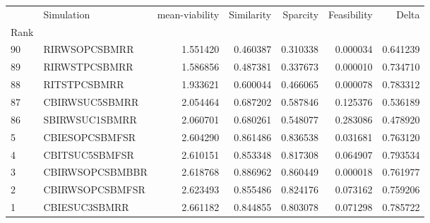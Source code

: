 \begin{tabular}{llrrrrr}
 & Simulation & mean-viability & Similarity & Sparcity & Feasibility & Delta \\
Rank &  &  &  &  &  &  \\
90 & RI\-RWS\-OPC\-SBM\-RR & 1.551420 & 0.460387 & 0.310338 & 0.000034 & 0.641239 \\
89 & RI\-RWS\-TPC\-SBM\-RR & 1.586856 & 0.487381 & 0.337673 & 0.000010 & 0.734710 \\
88 & RI\-TS\-TPC\-SBM\-RR & 1.933621 & 0.600044 & 0.466065 & 0.000078 & 0.783312 \\
87 & CBI\-RWS\-UC5\-SBM\-RR & 2.054464 & 0.687202 & 0.587846 & 0.125376 & 0.536189 \\
86 & SBI\-RWS\-UC1\-SBM\-RR & 2.060701 & 0.680261 & 0.548077 & 0.283086 & 0.478920 \\
5 & CBI\-ES\-OPC\-SBM\-FSR & 2.604290 & 0.861486 & 0.836538 & 0.031681 & 0.763120 \\
4 & CBI\-TS\-UC5\-SBM\-FSR & 2.610151 & 0.853348 & 0.817308 & 0.064907 & 0.793534 \\
3 & CBI\-RWS\-OPC\-SBM\-BBR & 2.618768 & 0.886962 & 0.860449 & 0.000018 & 0.761977 \\
2 & CBI\-RWS\-OPC\-SBM\-FSR & 2.623493 & 0.855486 & 0.824176 & 0.073162 & 0.759206 \\
1 & CBI\-ES\-UC3\-SBM\-RR & 2.661182 & 0.844855 & 0.803078 & 0.071298 & 0.785722 \\
\end{tabular}

